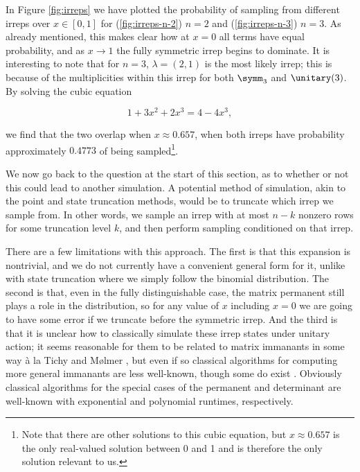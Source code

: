 In Figure \ref{fig:irreps} we have plotted the probability of sampling from different irreps over $x \in [0,1]$ for (\ref{fig:irreps-n-2}) $n=2$ and (\ref{fig:irreps-n-3}) $n=3$. As already mentioned, this makes clear how at $x=0$ all terms have equal probability, and as $x\rightarrow 1$ the fully symmetric irrep begins to dominate. It is interesting to note that for $n=3$, $\lambda=(2,1)$ is the most likely irrep; this is because of the multiplicities within this irrep for both $\symm_3$ and $\unitary(3)$. By solving the cubic equation

\begin{equation}
1+3x^2+2x^3 = 4-4x^3,
\end{equation}

\noindent we find that the two overlap when $x \approx 0.657$, when both irreps have probability approximately $0.4773$ of being sampled\footnote{Note that there are other solutions to this cubic equation, but $x\approx 0.657$ is the only real-valued solution between 0 and 1 and is therefore the only solution relevant to us.}.

We now go back to the question at the start of this section, as to whether or not this could lead to another simulation. A potential method of simulation, akin to the point and state truncation methods, would be to truncate which irrep we sample from. In other words, we sample an irrep with at most $n-k$ nonzero rows for some truncation level $k$, and then perform sampling conditioned on that irrep.

There are a few limitations with this approach. The first is that this expansion is nontrivial, and we do not currently have a convenient general form for it, unlike with state truncation where we simply follow the binomial distribution. The second is that, even in the fully distinguishable case, the matrix permanent still plays a role in the distribution, so for any value of $x$ including $x=0$ we are going to have some error if we truncate before the symmetric irrep. And the third is that it is unclear how to classically simulate these irrep states under unitary action; it seems reasonable for them to be related to matrix immanants in some way \`{a} la Tichy and M\o lmer \cite{tichy2017}, but even if so classical algorithms for computing more general immanants are less well-known, though some do exist \cite{hartmann1985, barvinok1990, burgisser2000}. Obviously classical algorithms for the special cases of the permanent and determinant are well-known with exponential \cite{glynn2010} and polynomial \cite{fisikopoulos2016} runtimes, respectively.

